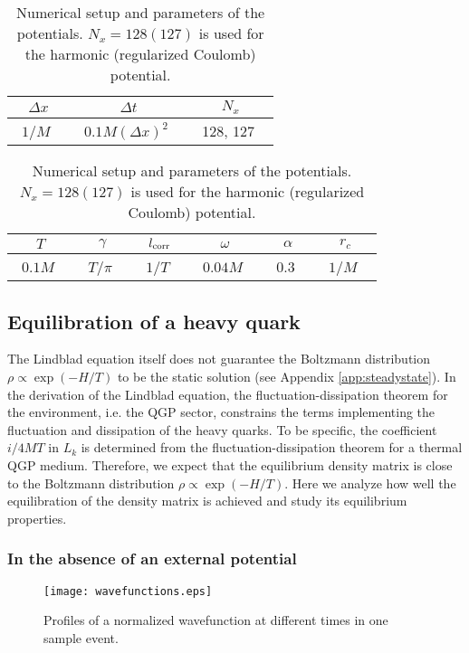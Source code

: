 \documentclass[prd,11pt, amsmath, amsymb, aps, reprint, tightenlines, nofootinbib, longbibliography, abbrv, preprintnumbers]{revtex4-1}
\begin{document}
\begin{table}[b]
\caption{Numerical setup and parameters of the potentials.
$N_x=128 (127)$ is used for the harmonic (regularized Coulomb) potential.}
\label{tbl:setup}
\begin{center}
\begin{tabular}{ccc}
\hline
\hline
$\Delta x$ & $\Delta t$ & $N_x$  \\ \hline
\ $1/M$ \ & \ $0.1M(\Delta x)^2$ \ & \ 128, 127 \ \\ \hline
\end{tabular}
\end{center}
\begin{center}
\begin{tabular}{ccc|ccc}
\hline
\hline
$T$ & $\gamma$ & $l_{\rm corr}$ & $\omega$ & $\alpha$ & $r_c$ \\ \hline
 \ $0.1M$ \ & \ $T/\pi$ \ & \ $1/T$ \ & \ $0.04M$ \ & \ 0.3 \ & \ $1/M$ \ \\ \hline
\end{tabular}
\end{center}
\end{table}

\subsection{Equilibration of a heavy quark}
The Lindblad equation itself does not guarantee the Boltzmann distribution $\rho\propto \exp(-H/T)$ to be the static solution (see Appendix \ref{app:steadystate}).
In the derivation of the Lindblad equation, the fluctuation-dissipation theorem for the environment, i.e. the QGP sector, constrains the terms implementing the fluctuation and dissipation of the heavy quarks.
To be specific, the coefficient $i/4MT$ in $L_k$ is determined from the fluctuation-dissipation theorem for a thermal QGP medium.
Therefore, we expect that the equilibrium density matrix is close to the Boltzmann distribution $\rho\propto \exp(-H/T)$.
Here we analyze how well the equilibration of the density matrix is achieved and study its equilibrium properties.

\subsubsection{In the absence of an external potential}
\begin{figure}
\texttt{[image: wavefunctions.eps]}
\caption{
Profiles of a normalized wavefunction at different times in one sample event.
}
\label{fig:wavefunctions}
\end{figure}
\end{document}
